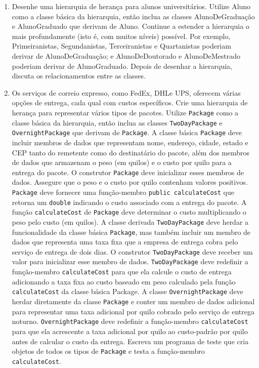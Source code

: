 \documentclass[fleqn]{article}
\begin{document}
\begin{enumerate}

  \item{
    Desenhe uma hierarquia de herança para alunos universitários. Utilize Aluno como a classe básica da hierarquia, então inclua as classes AlunoDeGraduação e AlunoGraduado que derivam de Aluno. Continue a estender a hierarquia o mais profundamente (isto é, com muitos níveis) possível. Por exemplo, Primeiranistas, Segundanistas, Terceiranistas e Quartanistas poderiam derivar de AlunoDeGraduação; e AlunoDeDoutorado e AlunoDeMestrado poderiam derivar de AlunoGraduado. Depois de desenhar a hierarquia, discuta os relacionamentos entre as classes.
  }

  \item{
    Os serviços de correio expresso, como FedEx, DHLe UPS, oferecem várias opções de entrega, cada qual com custos específicos. Crie uma hierarquia de herança para representar vários tipos de pacotes. Utilize \texttt{Package} como a classe básica da hierarquia, então inclua as classes \texttt{TwoDayPackage} e \texttt{OvernightPackage} que derivam de \texttt{Package}. A classe básica \texttt{Package} deve incluir membros de dados que representam nome, endereço, cidade, estado e CEP tanto do remetente como do destinatário do pacote, além dos membros de dados que armazenam o peso (em quilos) e o custo por quilo para a entrega do pacote. O construtor \texttt{Package} deve inicializar esses membros de dados. Assegure que o peso e o custo por quilo contenham valores positivos. \texttt{Package} deve fornecer uma função-membro \texttt{public calculateCost} que retorna um \texttt{double} indicando o custo associado com a entrega do pacote. A função \texttt{calculateCost} de \texttt{Package} deve determinar o custo multiplicando o peso pelo custo (em quilos). A classe derivada \texttt{TwoDayPackage} deve herdar a funcionalidade da classe básica \texttt{Package}, mas também incluir um membro de dados que representa uma taxa fixa que a empresa de entrega cobra pelo serviço de entrega de dois dias. O construtor \texttt{TwoDayPackage} deve receber um valor para inicializar esse membro de dados. \texttt{TwoDayPackage} deve redefinir a função-membro \texttt{calculateCost} para que ela calcule o custo de entrega adicionando a taxa fixa ao custo baseado em peso calculado pela função \texttt{calculateCost} da classe básica Package. A classe \texttt{OvernightPackage} deve herdar diretamente da classe \texttt{Package} e conter um membro de dados adicional para representar uma taxa adicional por quilo cobrado pelo serviço de entrega noturno. \texttt{OvernightPackage} deve redefinir a função-membro \texttt{calculateCost} para que ela acrescente a taxa adicional por quilo ao custo-padrão por quilo antes de calcular o custo da entrega. Escreva um programa de teste que cria objetos de todos os tipos de \texttt{Package} e testa a função-membro \texttt{calculateCost}.
  }


\end{enumerate}
\end{document}
